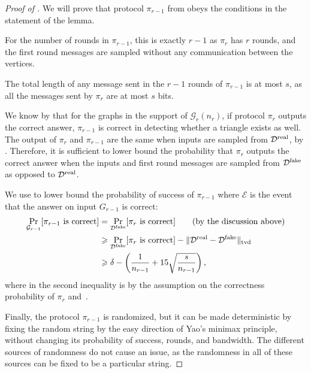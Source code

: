 \documentclass[11pt]{article}
\theoremstyle{definition}
\renewcommand{\geq}{\geqslant}
\newcommand{\tvd}[2]{\ensuremath{\norm{#1 - #2}_{\mathrm{tvd}}}}
\newcommand{\paren}[1]{\ensuremath{\left(#1\right)}\xspace}
\newcommand{\norm}[1]{\ensuremath{\|#1\|}}
\DeclareMathOperator*{\Prob}{\ensuremath{\textnormal{Pr}}}
\renewcommand{\Pr}{\Prob}
\newcommand{\event}{\ensuremath{\mathcal{E}}}
\newcommand{\prot}{\ensuremath{\pi}}
\newcommand{\cD}{\ensuremath{\mathcal{D}}}
\newcommand{\cG}{\ensuremath{\mathcal{G}}}
\newcommand{\cDreal}{\ensuremath{\cD^{\textnormal{real}}}}
\newcommand{\cDfake}{\ensuremath{\cD^{\textnormal{fake}}}}
\begin{document}
\begin{proof}[Proof of ]
	We will prove that protocol $\prot_{r-1}$ from  obeys the conditions in the statement of the lemma. 
	
	For the number of rounds in $\prot_{r-1}$, this is exactly $r-1$ as $\prot_r$ has $r$ rounds, and the first round messages are sampled without any communication between the vertices. 
	
	The total length of any message sent in the $r-1$ rounds of $\prot_{r-1}$ is at most $s$, as all the messages sent by $\prot_r$ are at most $s$ bits. 
	
	We know by  that for the graphs in the support of $\cG_r(n_r)$, if protocol $\prot_r$ outputs the correct answer, $\prot_{r-1}$ is correct in detecting whether a triangle exists as well. The output of $\prot_{r}$ and $\prot_{r-1}$ are the same when inputs are sampled from $\cDreal$, by . Therefore, it is sufficient to lower bound the probability that $\prot_r$ outputs the correct answer when the inputs and first round messages are sampled from $\cDfake$ as opposed to $\cDreal$.
	
	We use  to lower bound the probability of success of $\prot_{r-1}$ where $\event$ is the event that the answer on input $G_{r-1}$ is correct: 
	\begin{align*}
		\Pr_{\cG_{r-1}}[\prot_{r-1} \textnormal{ is correct}] &= \Pr_{\cDfake}[\prot_{r} \textnormal{ is correct}] \tag{by the discussion above} \\
		&\geq \Pr_{\cDfake}[\prot_{r} \textnormal{ is correct}] - \tvd{\cDreal}{\cDfake} \\
		&\geq \delta - \paren{\frac1{n_{r-1}} + 15 \sqrt{\frac{s}{n_{r-1}}}},
	\end{align*}
	where in the second inequality is by the assumption on the correctness probability of $\prot_r$ and~. 
	
	Finally, the protocol $\prot_{r-1}$ is randomized, but it can be made deterministic by fixing the random string by the easy direction of Yao's minimax principle, without changing its probability of success, rounds, and bandwidth. 
	The different sources of randomness do not cause an issue, as the randomness in all of these sources can be fixed to be a particular string. 
\end{proof}

\clearpage
\end{document}

